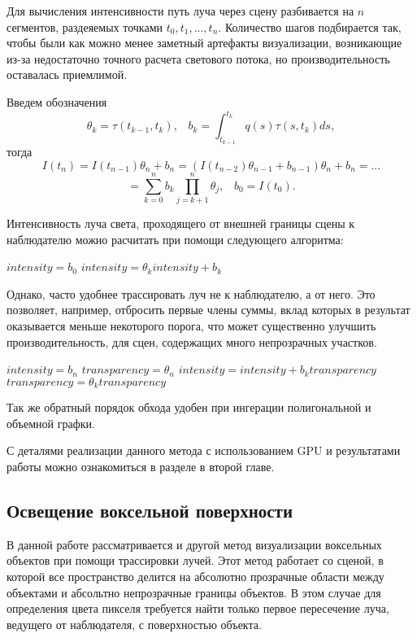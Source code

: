 Для вычисления интенсивности путь луча через сцену разбивается на $n$  сегментов, раздеяемых точками ${t_0, t_1, ..., t_n}$. Количество шагов подбирается так, чтобы были как можно менее заметный артефакты визуализации, возникающие из-за недостаточно точного расчета светового потока, но производительность оставалась приемлимой.

Введем обозначения $$ \theta_k = \tau(t_{k-1}, t_k), \;\;\; b_k = \int_{t_{k-1}}^{t_k}\! q(s)\tau(s, t_k) ds, $$ тогда $$ I(t_n) = I(t_{n-1})\theta_n + b_n = (I(t_{n-2})\theta_{n-1} + b_{n-1})\theta_n + b_n = ...$$ 
$$ = \sum_{k=0}^n b_k \prod_{j=k+1}^n \theta_j, \;\;\; b_0 = I(t_0).$$

Интенсивность луча света, проходящего от внешней границы сцены к наблюдателю можно расчитать при помощи следующего алгоритма:

\begin{algorithmic}
\STATE $intensity = b_0$
\STATE $intensity = \theta_k intensity + b_k$
\ENDFOR
\end{algorithmic}

Однако, часто удобнее трассировать луч не к наблюдателю, а от него. Это позволяет, например, отбросить первые члены суммы, вклад которых в результат оказывается меньше некоторого порога, что может существенно улучшить производительность, для сцен, содержащих много непрозрачных участков.

\begin{algorithmic}
\STATE $intensity = b_n$
\STATE $transparency = \theta_n$
\STATE $intensity = intensity + b_k transparency$
\STATE $transparency = \theta_k transparency$
\ENDFOR
\end{algorithmic}

Так же обратный порядок обхода удобен при ингерации полигональной и объемной графки.

С деталями реализации данного метода с использованием GPU и результатами работы можно ознакомиться в разделе в второй главе.

\subsection{Освещение воксельной поверхности}

В данной работе рассматривается и другой метод визуализации воксельных объектов при помощи трассировки лучей. Этот метод работает со сценой, в которой все пространство делится на абсолютно прозрачные области между объектами и абсольтно непрозрачные границы объектов. В этом случае для определения цвета пикселя требуется найти только первое пересечение луча, ведущего от наблюдателя, с поверхностью объекта. 

